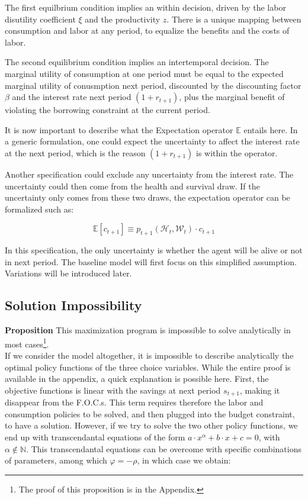 \documentclass{article}
\begin{document}
The first equilbrium condition implies an within decision,
driven by the labor disutility coefficient $\xi$ and the productivity $z$.
There is a unique mapping between consumption and labor at any period, to 
equalize the benefits and the costs of labor.

The second equilibrium condition implies an intertemporal decision.
The marginal utility of consumption at one period must be equal to the 
expected marginal utility of conusmption next period, discounted by 
the discounting factor $\beta$ and the interest rate next period $(1+r_{t+1})$, 
plus the marginal benefit of violating the borrowing constraint at the current period. 

It is now important to describe what the Expectation operator $\mathbb{E}$ entails here. 
In a generic formulation, one could expect the uncertainty to affect the interest rate at the next period, 
which is the reason $(1+r_{t+1})$ is within the operator.

Another specification could exclude any uncertainty from 
the interest rate. 
The uncertainty could then come from the health and survival draw. 
If the uncertainty only comes from these two draws, the expectation operator can be formalized such as: 

$$\mathbb{E}\left[c_{t+1}\right] \equiv p_{t+1}(\mathcal{H}_{t},\mathcal{W}_{t}) \cdot c_{t+1}$$

In this specification, the only uncertainty is whether the agent will be alive or not in next period.
The baseline model will first focus on this simplified assumption. 
Variations will be introduced later.

\subsection{Solution Impossibility}

\textbf{Proposition}
This maximization program is impossible to solve analytically in most cases\footnote{The proof of this proposition is in the Appendix.}.
\\

If we consider the model altogether, it is impossible to describe 
analytically the optimal policy functions of the three choice variables.
While the entire proof is available in the appendix, a quick explanation
is possible here.
First, the objective functions is linear with the savings at next period $s_{t+1}$, 
making it disappear from the F.O.C.s.
This term requires therefore the labor and consumption policies to be solved, 
and then plugged into the budget constraint, to have a solution. 
However, if we try to solve the two other policy functions, 
we end up with transcendantal equations of the form $a\cdot x^{\alpha} + b\cdot x + c = 0$, 
with $\alpha\notin \mathbb{N}$. 
This transcendantal equations can be overcome with specific combinations 
of parameters, among which $\varphi = -\rho$, in which case we obtain: 
\end{document}
